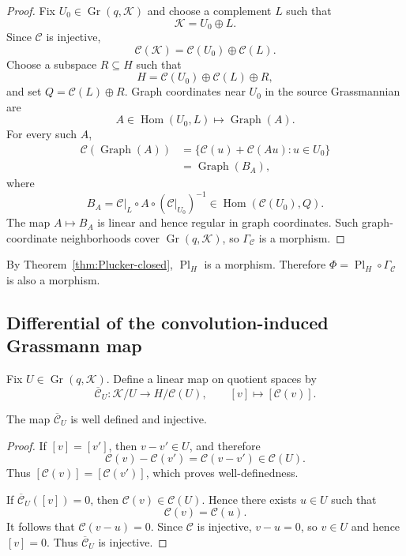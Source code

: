 \documentclass{siamonline250211}
\newcommand{\Gr}{\operatorname{Gr}}
\newcommand{\Pl}{\operatorname{Pl}}
\newcommand{\Hom}{\operatorname{Hom}}
\newcommand{\cK}{\mathcal K}
\newcommand{\cC}{\mathcal C}
\begin{document}
\begin{proof}
Fix $U_0\in\Gr(q,\cK)$ and choose a complement $L$ such that
\[
  \cK=U_0\oplus L.
\]
Since $\cC$ is injective,
\[
  \cC(\cK)=\cC(U_0)\oplus\cC(L).
\]
Choose a subspace $R\subseteq H$ such that
\[
  H=\cC(U_0)\oplus\cC(L)\oplus R,
\]
and set $Q=\cC(L)\oplus R$. Graph coordinates near $U_0$ in the source
Grassmannian are
\[
  A\in\Hom(U_0,L)
  \longmapsto\operatorname{Graph}(A).
\]
For every such $A$,
\[
\begin{aligned}
  \cC(\operatorname{Graph}(A))
  &=\{\cC(u)+\cC(Au):u\in U_0\}\\
  &=\operatorname{Graph}(B_A),
\end{aligned}
\]
where
\[
  B_A=\cC|_L\circ A\circ(\cC|_{U_0})^{-1}
  \in\Hom(\cC(U_0),Q).
\]
The map $A\mapsto B_A$ is linear and hence regular in graph coordinates. Such
graph-coordinate neighborhoods cover $\Gr(q,\cK)$, so $\Gamma_{\cC}$ is a
morphism.
\end{proof}

By Theorem~\ref{thm:Plucker-closed}, $\Pl_H$ is a morphism. Therefore
$\Phi=\Pl_H\circ\Gamma_{\cC}$ is also a morphism.

\subsection{Differential of the convolution-induced Grassmann map}

Fix $U\in\Gr(q,\cK)$. Define a linear map on quotient spaces by
\begin{equation}\label{eq:Cbar}
  \overline{\cC}_U:\cK/U\longrightarrow H/\cC(U),
  \qquad [v]\longmapsto[\cC(v)].
\end{equation}

\begin{lemma}\label{lem:Cbar-well-defined-injective}
The map $\overline{\cC}_U$ is well defined and injective.
\end{lemma}

\begin{proof}
If $[v]=[v']$, then $v-v'\in U$, and therefore
\[
  \cC(v)-\cC(v')=\cC(v-v')\in\cC(U).
\]
Thus $[\cC(v)]=[\cC(v')]$, which proves well-definedness.

If $\overline{\cC}_U([v])=0$, then $\cC(v)\in\cC(U)$. Hence there exists
$u\in U$ such that
\[
  \cC(v)=\cC(u).
\]
It follows that $\cC(v-u)=0$. Since $\cC$ is injective, $v-u=0$, so $v\in U$
and hence $[v]=0$. Thus $\overline{\cC}_U$ is injective.
\end{proof}
\end{document}
